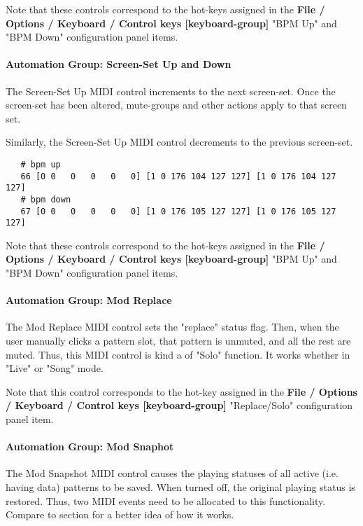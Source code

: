    Note that these controls correspond to the hot-keys assigned in
   the \textbf{File / Options / Keyboard / Control keys [keyboard-group]} 
   "BPM Up" and "BPM Down" configuration panel items.

\paragraph{Automation Group: Screen-Set Up and Down}
\label{paragraph:seq64_rc_file_midi_ctrl_ssupdn}

   The Screen-Set Up MIDI control increments to the next screen-set. 
   Once the screen-set has been altered, mute-groups and other
   actions apply to that screen set.

   Similarly, the Screen-Set Up MIDI control decrements to the previous
   screen-set.

   \begin{verbatim}
   # bpm up
   66 [0 0   0   0   0   0] [1 0 176 104 127 127] [1 0 176 104 127 127]
   # bpm down
   67 [0 0   0   0   0   0] [1 0 176 105 127 127] [1 0 176 105 127 127]
   \end{verbatim}

   Note that these controls correspond to the hot-keys assigned in
   the \textbf{File / Options / Keyboard / Control keys [keyboard-group]} 
   "BPM Up" and "BPM Down" configuration panel items.

\paragraph{Automation Group: Mod Replace}
\label{paragraph:seq64_rc_file_midi_ctrl_modrep}

   The Mod Replace MIDI control sets the "replace" status flag.
   Then, when the user manually clicks a pattern slot,
   that pattern is unmuted, and all the rest are muted.
   Thus, this MIDI control is kind a of "Solo" function.
   It works whether in "Live" or "Song" mode.

   Note that this control corresponds to the hot-key assigned in
   the \textbf{File / Options / Keyboard / Control keys [keyboard-group]} 
   "Replace/Solo" configuration panel item.

\paragraph{Automation Group: Mod Snaphot}
\label{paragraph:seq64_rc_file_midi_ctrl_modsnap}

   The Mod Snapshot MIDI control causes the playing statuses of all active
   (i.e. having data) patterns to be saved.  When turned off, the
   original playing status is restored.  Thus, two MIDI events
   need to be allocated to this functionality. Compare
   to section 
   for a better idea of how it works.


